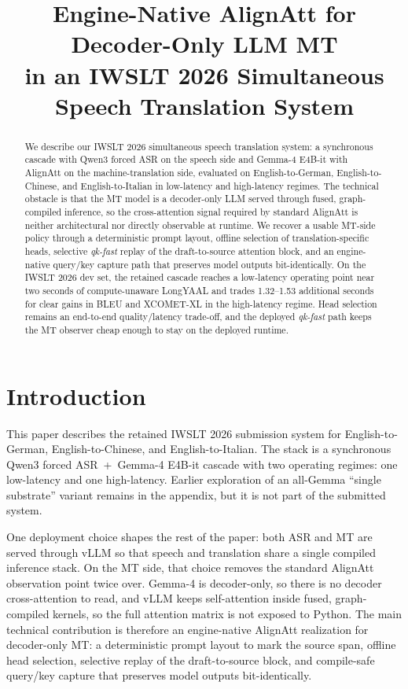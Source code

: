 \documentclass[11pt]{article}
\title{Engine-Native AlignAtt for Decoder-Only LLM MT\\in an IWSLT 2026 Simultaneous Speech Translation System}
\author{}
\begin{document}
\maketitle

\begin{abstract}
We describe our IWSLT 2026 simultaneous speech translation system: a
synchronous cascade with Qwen3 forced ASR on the speech side and Gemma-4
E4B-it with AlignAtt on the machine-translation side, evaluated on
English-to-German, English-to-Chinese, and English-to-Italian in low-latency
and high-latency regimes. The technical obstacle is that the MT model is a
decoder-only LLM served through fused, graph-compiled inference, so the
cross-attention signal required by standard AlignAtt is neither architectural
nor directly observable at runtime. We recover a usable MT-side policy through
a deterministic prompt layout, offline selection of translation-specific
heads, selective \emph{qk-fast} replay of the draft-to-source attention block,
and an engine-native query/key capture path that preserves model outputs
bit-identically. On the IWSLT 2026 dev set, the retained cascade reaches a
low-latency operating point near two seconds of compute-unaware LongYAAL and
trades 1.32--1.53 additional seconds for clear gains in BLEU and XCOMET-XL in
the high-latency regime. Head selection remains an end-to-end
quality/latency trade-off, and the deployed \emph{qk-fast} path keeps the MT
observer cheap enough to stay on the deployed runtime.
\end{abstract}

\section{Introduction}
\label{sec:intro}

This paper describes the retained IWSLT 2026 submission system for
English-to-German, English-to-Chinese, and English-to-Italian. The stack is a
synchronous Qwen3 forced ASR \,+\, Gemma-4 E4B-it cascade with two operating
regimes: one low-latency and one high-latency. Earlier exploration of an
all-Gemma ``single substrate'' variant remains in the appendix, but it is not
part of the submitted system.

One deployment choice shapes the rest of the paper: both ASR and MT are served
through vLLM so that speech and translation share a single compiled inference
stack. On the MT side, that choice removes the standard AlignAtt observation
point twice over. Gemma-4 is decoder-only, so there is no decoder
cross-attention to read, and vLLM keeps self-attention inside fused,
graph-compiled kernels, so the full attention matrix is not exposed to Python.
The main technical contribution is therefore an engine-native AlignAtt
realization for decoder-only MT: a deterministic prompt layout to mark the
source span, offline head selection, selective replay of the draft-to-source
block, and compile-safe query/key capture that preserves model outputs
bit-identically.
\end{document}
